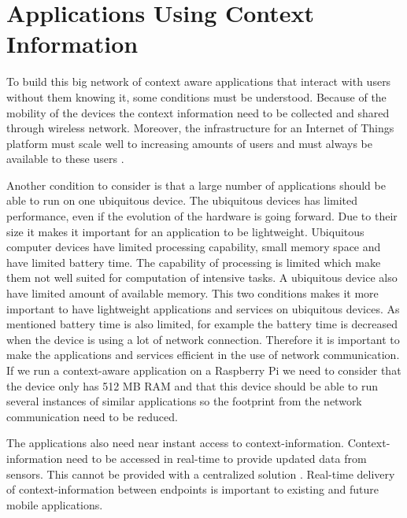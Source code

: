 \section{Applications Using Context Information}
To build this big network of context aware applications that interact with users without them knowing it, some conditions must be understood. Because of the mobility of the devices the context information need to be collected and shared through wireless network. Moreover, the infrastructure for an Internet of Things platform must scale well to increasing amounts of users and must always be available to these users \cite{Kanter539187}.

Another condition to consider is that a large number of applications should be able to run on one ubiquitous device. The ubiquitous devices has limited performance, even if the evolution of the hardware is going forward. Due to their size it makes it important for an application to be lightweight. Ubiquitous computer devices have limited processing capability, small memory space and have limited battery time. The capability of processing is limited which make them not well suited for computation of intensive tasks. A ubiquitous device also have limited amount of available memory. This two conditions makes it more important to have lightweight applications and services on ubiquitous devices. As mentioned battery time is also limited, for example the battery time is decreased when the device is using a lot of network connection. Therefore it is important to make the applications and services efficient in the use of network communication. 
If we run a context-aware application on a Raspberry Pi we need to consider that the device only has 512 MB RAM and that this device should be able to run several instances of similar applications so the footprint from the network communication need to be reduced. 

The applications also need near instant access to context-information. Context-information need to be accessed in real-time to provide updated data from sensors. This cannot be provided with a centralized solution \cite{TheMediaSenseFramework}. Real-time delivery of context-information between endpoints is important to existing and future mobile applications. 
